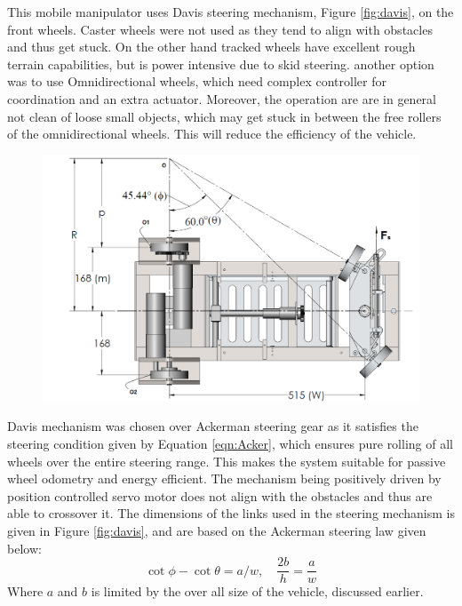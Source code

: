 This mobile manipulator uses Davis steering mechanism,  Figure \ref{fig:davis},  on the front wheels. Caster wheels  were not used as they tend to align with  obstacles and thus get stuck. On the  other hand tracked wheels have excellent rough terrain capabilities, but is power intensive due to skid steering. another option was to use   Omnidirectional wheels, which need complex controller for coordination and an extra actuator. Moreover, the operation are are in general not clean of loose small objects, which may get stuck in between the free rollers of the omnidirectional wheels. This will reduce the efficiency of the vehicle.  

\begin{figure}
 	\centering
	\includegraphics[width=\linewidth,keepaspectratio]{Chapter3/fig/steerringCondition}
	\label{fig:steerCond} 
\end{figure} 
 

Davis mechanism was chosen over Ackerman steering gear as it satisfies the steering condition given by  Equation \ref{eqn:Acker}, which ensures pure rolling of all  wheels over the entire steering range. This makes the system suitable for passive wheel odometry and energy efficient.  The mechanism being positively driven by position controlled servo motor does not align with the obstacles and thus are able to crossover it. The dimensions of the links used in the steering mechanism is given in Figure \ref{fig:davis}, and are based on the Ackerman steering law given below:
\begin{equation}
\label{eqn:Acker}
\cot\phi-\cot\theta=a/w, \quad  \frac{2b}{h}=\frac{a}{w}
\end{equation}
Where $a$ and $b$ is limited by the over all size of the vehicle, discussed earlier.

